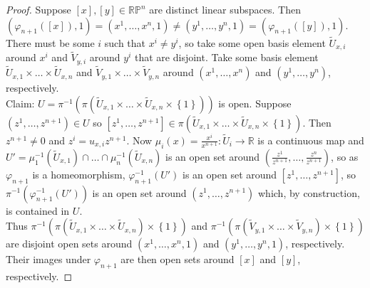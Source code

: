 \documentclass[reqno]{amsart}
\theoremstyle{plain}%
\theoremstyle{definition}
\theoremstyle{remark}
\begin{document}
        \begin{proof}
            Suppose $\left[ x \right] ,\left[ y \right] \in
        \mathbb{R}\mathbb{P}^{n}$ are distinct linear subspaces. Then
         $\left( \varphi_{n+1}\left( \left[ x \right]  \right) ,1 \right)  =
         \left( x^{1}, \ldots, x^{n}, 1 \right) \neq 
         \left( y^{1}, \ldots, y^{n}, 1 \right) =
         \left( \varphi_{n+1}\left( \left[ y \right]  \right) ,1 \right) $.
         There must be some $i$ such that
         $x^{i} \neq y^{i}$, so take some open basis element
         $\tilde{U}_{x,i}$ around $x^{i}$ and
         $\tilde{V}_{y,i}$ around $y^{i}$ that are disjoint. Take some
         basis element
         $\tilde{U}_{x,1} \times \ldots \times \tilde{U}_{x,n}$ and
         $\tilde{V}_{y,1}\times \ldots \times \tilde{V}_{y,n}$ around
         $\left( x^{1},\ldots, x^{n} \right) $ and
         $\left( y^{1}, \ldots, y^{n} \right) $, respectively.\\
         Claim: $U=\pi^{-1} \left( \pi \left( \tilde{U}_{x,1} \times \ldots \times 
         \tilde{U}_{x,n} \times \left\{ 1 \right\} \right)   \right) $ is open. Suppose
         $\left( z^{1},\ldots,z^{n+1} \right) \in U$ so
         $\left[ z^{1},\ldots, z^{n+1} \right] \in 
         \pi \left( \tilde{U}_{x,1} \times \ldots \times \tilde{U}_{x,n} 
         \times  \left\{ 1 \right\} \right) $.
         Then $z^{n+1}\neq 0$ and $z^{i} = u_{x,i} z^{n+1}$. Now
        $\mu_i (x) = \frac{x^{i}}{x^{n+1}}
         \colon \tilde{U}_i \to \mathbb{R}$ is a continuous map and
         $U'=\mu_1^{-1} \left( \tilde{U}_{x,1}  \right) \cap  
         \ldots \cap  \mu_n^{-1} \left( \tilde{U}_{x,n} \right) $ is an open set
         around $\left( \frac{z^{1}}{z^{n+1}}, \ldots, \frac{z^{n}}{z^{n+1}} \right) $, 
         so as $\varphi_{n+1}$ is a homeomorphism,
         $\varphi_{n+1}^{-1} (U')$ is an open set around
         $\left[ z^{1},\ldots, z^{n+1} \right] $, so
         $\pi^{-1} \left( \varphi_{n+1}^{-1}(U') \right) $ is an open set around
         $\left( z^{1},\ldots, z^{n+1} \right) $ which, by construction, is contained
         in
         $U$.\\
         \linebreak
         Thus
         $\pi^{-1}\left( \pi \left( \tilde{U}_{x,1} \times \ldots \times 
         \tilde{U}_{x,n} \right) \times \left\{ 1 \right\}   \right) $ and
         $\pi^{-1}\left( \pi \left( \tilde{V}_{y,1} \times \ldots \times
         \tilde{V}_{y,n} \right) \times \left\{ 1 \right\}  \right) $ are disjoint open sets around $\left(
        x^{1}, \ldots, x^{n}, 1 \right) $ and $\left( y^{1}, \ldots, y^{n} ,1 \right) $,
        respectively. Their images under $\varphi_{n+1}$ are then
        open sets around $\left[ x \right] $ and $\left[ y \right] $, respectively.
        \end{proof} 
\end{document}
